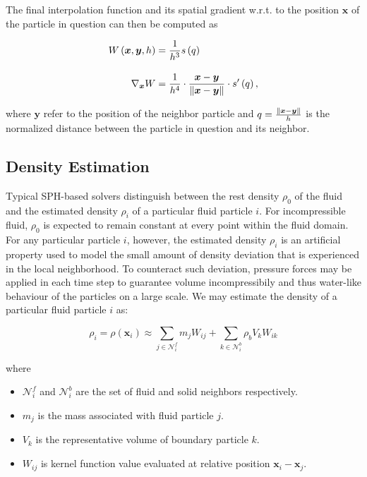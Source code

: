 \documentclass[
	11pt, 
	DIV10,
	ngerman,
	a4paper, 
	oneside, 
	headings=normal, 
	captions=tableheading,
	final, 
	numbers=noenddot
]{scrartcl}
\DeclarePairedDelimiter{\norm}{\lVert}{\rVert}
\begin{document}
The final interpolation function and its spatial gradient w.r.t. to the position $ \boldsymbol{x} $ of the particle in question can then be computed as

\begin{equation}
\begin{split}
	\label{eq13}
	W\left(\boldsymbol{x}, \boldsymbol{y}, h\right) &= \frac{1}{h^{3}}s\left(q\right) \\[1em]
	\nabla_{\boldsymbol{x}} W &= \frac{1}{h^{4}} \cdot \frac{\boldsymbol{x} - \boldsymbol{y}}{\norm{\boldsymbol{x} - \boldsymbol{y}}} \cdot s^{\prime}\left(q\right),
\end{split}
\end{equation}

where $ \boldsymbol{y} $ refer to the position of the neighbor particle and $ q = \frac{\norm{\boldsymbol{x} - \boldsymbol{y}}}{h} $ is the normalized distance between the particle in question and its neighbor.

\subsection{Density Estimation}

Typical SPH-based solvers distinguish between the rest density $ \rho_{0} $ of the fluid and the estimated density $ \rho_{i} $ of a particular fluid particle $ i $. For incompressible fluid, $ \rho_{0} $ is expected to remain constant at every point within the fluid domain. For any particular particle $ i $, however, the estimated density $ \rho_{i} $ is an artificial property used to model the small amount of density deviation that is experienced in the local neighborhood. To counteract such deviation, pressure forces may be applied in each time step to guarantee volume incompressibily and thus water-like behaviour of the particles on a large scale. We may estimate the density of a particular fluid particle $ i $ as:

\begin{equation}
    \label{eq14}
    \rho_{i} = \rho(\mathbf{x}_{i}) \approx \sum_{j \in \mathcal{N}_{i}^{f}} m_{j} W_{ij} + \sum_{k \in \mathcal{N}_{i}^{b}} \rho_{b} V_{k} W_{ik}
\end{equation}

where

\begin{itemize}
    \item $ \mathcal{N}_{i}^{f} $ and $ \mathcal{N}_{i}^{b} $ are the set of fluid and solid neighbors respectively.
    \item $ m_{j} $ is the mass associated with fluid particle $ j $.
    \item $ V_{k} $ is the representative volume of boundary particle $ k $.
    \item $ W_{ij} $ is kernel function value evaluated at relative position $ \mathbf{x}_i - \mathbf{x}_j $.
\end{itemize}
\end{document}
